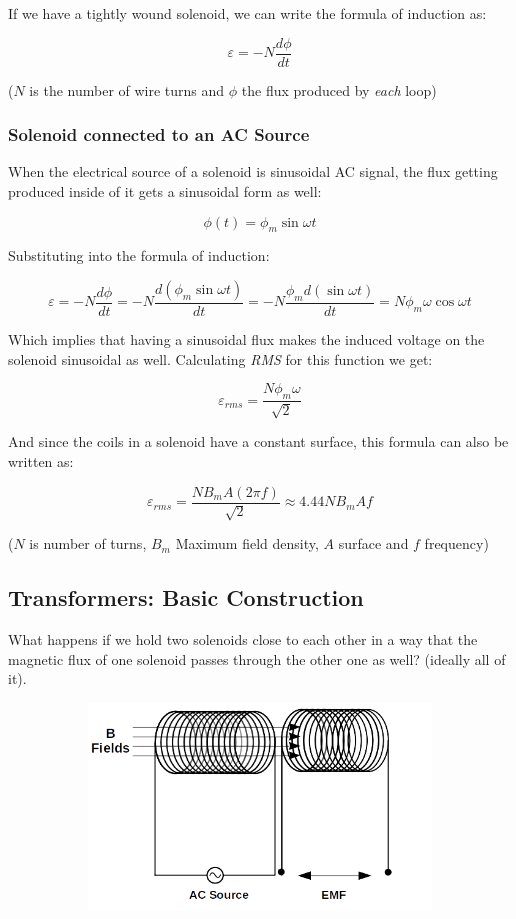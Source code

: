 \documentclass{article}
\begin{document}
	If we have a tightly wound solenoid, we can write the formula of induction as:
	
	$$ \varepsilon = -N\frac{d\phi}{dt} $$
	
	($N$ is the number of wire turns and $\phi$ the flux produced by \textit{each} loop)
	
	\subsubsection{Solenoid connected to an AC Source}	
	When the electrical source of a solenoid is sinusoidal AC signal, the flux getting produced inside of it gets a sinusoidal form as well:
	
	$$ \phi(t) = \phi_{m} \sin \omega t $$
	
	Substituting into the formula of induction:
	
	$$ \varepsilon = -N \frac{d\phi}{dt} = - N \frac{d (\phi_{m} \sin \omega t)}{dt} = -N \frac{\phi_{m} d (\sin \omega t)}{dt} = N \phi_{m} \omega \cos \omega t $$
	
	Which implies that having a sinusoidal flux makes the induced voltage on the solenoid sinusoidal as well.
	Calculating \textit{RMS} for this function we get:
	
	$$ \varepsilon_{rms} = \frac{N \phi_{m} \omega}{\sqrt{2}}$$
	
	And since the coils in a solenoid have a constant surface, this formula can also be written as:
	
	$$ \varepsilon_{rms} = \frac{N B_{m} A (2\pi f)}{\sqrt{2}} \approx 4.44NB_{m}Af $$
	
	($N$ is number of turns, $B_m$ Maximum field density, $A$ surface and $f$ frequency)
		
	\subsection{Transformers: Basic Construction}
	
	What happens if we hold two solenoids close to each other in a way that the magnetic flux of one solenoid passes through the other one as well? (ideally all of it).
	
	\begin{figure}[h!]
	\centering
	\begin{subfigure}[b]{0.9\linewidth}
		\includegraphics[width=\linewidth]{basic_transformer.png}
	\end{subfigure}
	\end{figure}
	
\end{document}
